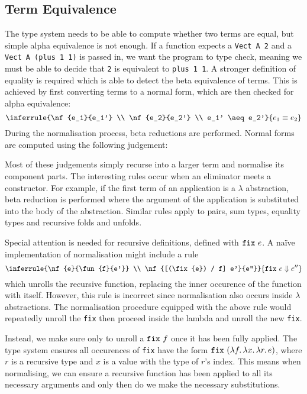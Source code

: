\documentclass[12pt,a4paper,twoside]{report}
\begin{document}
\subsection{Term Equivalence}

The type system needs to be able to compute whether two terms are equal, but simple alpha equivalence is not enough.
If a function expects a \lstinline{Vect A 2} and a \lstinline{Vect A (plus 1 1)} is passed in, we want the program to type check, meaning we must be able to decide that \lstinline{2} is equivalent to \lstinline{plus 1 1}.
A stronger definition of equality is required which is able to detect the beta equivalence of terms.
This is achieved by first converting terms to a normal form, which are then checked for alpha equivalence:
\[
    \inferrule{\nf{e_1}{e_1'} \\ \nf{e_2}{e_2'} \\ e_1' \aeq e_2'} {e_1 \equiv e_2}
\]
During the normalisation process, beta reductions are performed.
Normal forms are computed using the following judgement:

\norm{}

Most of these judgements simply recurse into a larger term and normalise its component parts.
The interesting rules occur when an eliminator meets a constructor.
For example, if the first term of an application is a \(\lambda\) abstraction, beta reduction is performed where the argument of the application is substituted into the body of the abstraction.
Similar rules apply to pairs, sum types, equality types and recursive folds and unfolds.

Special attention is needed for recursive definitions, defined with \(\mathtt{fix}\ e\).
A na\"ive implementation of normalisation might include a rule
\[
    \inferrule{\nf{e}{\fun{f}{e'}} \\ \nf{[(\fix{e}) / f] e'}{e''}} {\nf{\fix{e}}{e''}}
\]
which unrolls the recursive function, replacing the inner occurence of the function with itself.
However, this rule is incorrect since normalisation also occurs inside \(\lambda\) abstractions.
The normalisation procedure equipped with the above rule would repeatedly unroll the \texttt{fix} then proceed inside the lambda and unroll the new \texttt{fix}.

Instead, we make sure only to unroll a \(\mathtt{fix}\ f\) once it has been fully applied.
The type system ensures all occurences of \texttt{fix} have the form \(\mathtt{fix}\ (\lambda f \ldotp \lambda x \ldotp \lambda r \ldotp e)\), where \(r\) is a recursive type and \(x\) is a value with the type of \(r\)'s index.
This means when normalising, we can ensure a recursive function has been applied to all its necessary arguments and only then do we make the necessary substitutions.
\end{document}
